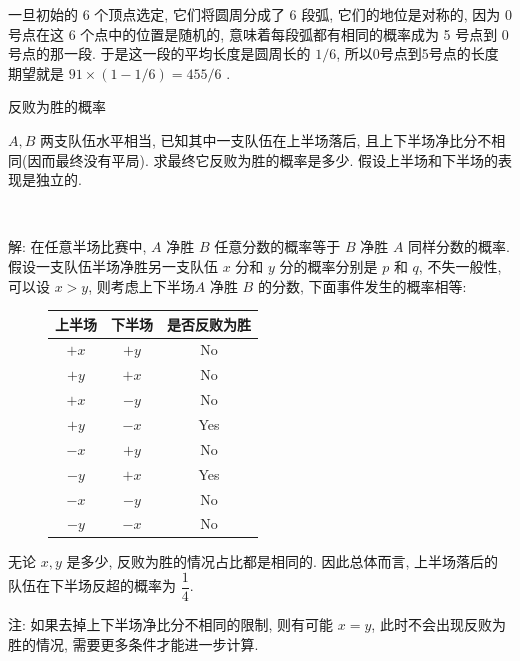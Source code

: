 一旦初始的 6 个顶点选定, 它们将圆周分成了 6 段弧, 它们的地位是对称的, 因为 0 号点在这 6 个点中的位置是随机的, 意味着每段弧都有相同的概率成为 5 号点到 0 号点的那一段. 于是这一段的平均长度是圆周长的 $1/6$, 所以0号点到5号点的长度期望就是 $91\times(1-1/6) = 455/6$ .


\newpage
\noindent 反败为胜的概率

$A,B$ 两支队伍水平相当, 已知其中一支队伍在上半场落后, 且上下半场净比分不相同(因而最终没有平局). 求最终它反败为胜的概率是多少. 假设上半场和下半场的表现是独立的.

~

解: 在任意半场比赛中, $A$ 净胜 $B$ 任意分数的概率等于 $B$ 净胜 $A$ 同样分数的概率. 假设一支队伍半场净胜另一支队伍 $x$ 分和 $y$ 分的概率分别是 $p$ 和 $q$, 不失一般性, 可以设 $x > y$, 则考虑上下半场$A$ 净胜 $B$ 的分数, 下面事件发生的概率相等:
\begin{figure}[htbp]
\centering
\begin{tabular}{c|c|c}
\hline
上半场 & 下半场 & 是否反败为胜 \\ \hline
$+x$ & $+y$ & No \\ \hline
$+y$ & $+x$ & No \\ \hline
$+x$ & $-y$ & No \\ \hline
$+y$ & $-x$ & Yes \\ \hline
$-x$ & $+y$ & No \\ \hline
$-y$ & $+x$ & Yes \\ \hline
$-x$ & $-y$ & No \\ \hline
$-y$ & $-x$ & No \\ \hline
\end{tabular}
\end{figure}

无论 $x,y$ 是多少, 反败为胜的情况占比都是相同的. 因此总体而言, 上半场落后的队伍在下半场反超的概率为 $\dfrac{1}{4}$.

注: 如果去掉上下半场净比分不相同的限制, 则有可能 $x=y$, 此时不会出现反败为胜的情况, 需要更多条件才能进一步计算.


\newpage

